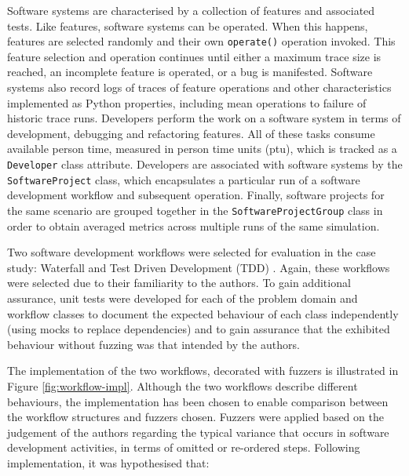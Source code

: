 \documentclass{sig-alternate}
\begin{document}
Software systems are characterised by a collection of features and associated
tests.  Like features, software systems can be operated.  When this happens,
features are selected randomly and their own \lstinline!operate()!  operation
invoked.  This feature selection and operation continues until either a maximum
trace size is reached, an incomplete feature is operated, or a bug is
manifested.  Software systems also record logs of traces of feature operations
and other characteristics implemented as Python properties, including mean
operations to failure of historic trace runs.  Developers perform the work on a
software system in terms of development, debugging and refactoring features.
All of these tasks consume available person time, measured in person time units
(ptu), which is tracked as a \lstinline!Developer! class attribute.  Developers
are associated with software systems by the \lstinline!SoftwareProject! class,
which encapsulates a particular run of a software development workflow and
subsequent operation.  Finally, software projects for the same scenario are
grouped together in the \lstinline!SoftwareProjectGroup! class in order to
obtain averaged metrics across multiple runs of the same simulation.

Two software development workflows were selected for evaluation in the case
study: Waterfall \citep{benington83production} and Test Driven Development (TDD)
\citep{beck02test}.  Again, these workflows were selected due to their
familiarity to the authors.  To gain additional assurance, unit tests were
developed for each of the problem domain and workflow classes to document the
expected behaviour of each class independently (using mocks to replace
dependencies) and to gain assurance that the exhibited behaviour without fuzzing
was that intended by the authors.

The implementation of the two workflows, decorated with fuzzers is illustrated
in Figure \ref{fig:workflow-impl}.  Although the two workflows describe
different behaviours, the implementation has been chosen to enable comparison
between the workflow structures and fuzzers chosen.  Fuzzers were applied based
on the judgement of the authors regarding the typical variance that occurs in
software development activities, in terms of omitted or re-ordered steps.
Following implementation, it was hypothesised that:
\end{document}
